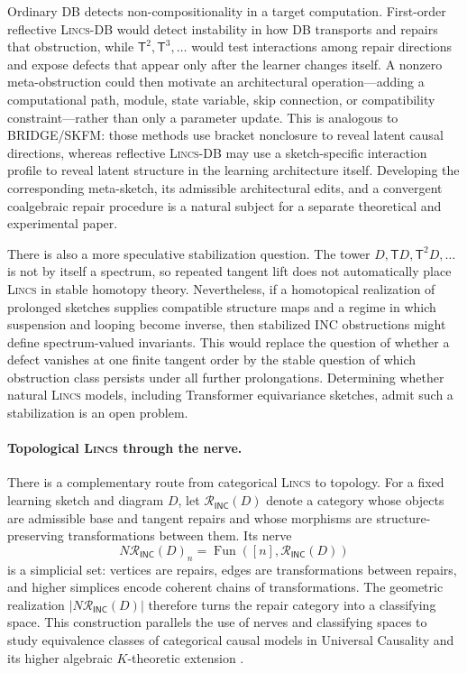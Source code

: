\documentclass{article}
\newcommand{\T}{\mathsf{T}}
\newcommand{\INC}{\mathsf{INC}}
\begin{document}
Ordinary DB detects non-compositionality in a target computation.  First-order
reflective \textsc{Lincs}-DB would detect instability in how DB transports and repairs
that obstruction, while \(\T^2,\T^3,\ldots\) would test interactions among
repair directions and expose defects that appear only after the learner
changes itself.  A nonzero meta-obstruction could then motivate an
architectural operation---adding a computational path, module, state variable,
skip connection, or compatibility constraint---rather than only a parameter
update.  This is analogous to BRIDGE/SKFM: those methods use bracket
nonclosure to reveal latent causal directions, whereas reflective
\textsc{Lincs}-DB may use a sketch-specific interaction profile to reveal latent structure in
the learning architecture itself.  Developing the corresponding meta-sketch,
its admissible architectural edits, and a convergent coalgebraic repair
procedure is a natural subject for a separate theoretical and experimental
paper.

There is also a more speculative stabilization question.  The tower
$D,\T D,\T^2D,\ldots$ is not by itself a spectrum, so repeated tangent lift
does not automatically place \textsc{Lincs}   in stable homotopy theory.  Nevertheless,
if a homotopical realization of prolonged sketches supplies compatible
structure maps and a regime in which suspension and looping become inverse,
then stabilized INC obstructions might define spectrum-valued invariants.
This would replace the question of whether a defect vanishes at one finite
tangent order by the stable question of which obstruction class persists
under all further prolongations.  Determining whether natural \textsc{Lincs}   models,
including Transformer equivariance sketches, admit such a stabilization is an
open problem.

\paragraph{Topological \textsc{Lincs}   through the nerve.}
There is a complementary route from categorical \textsc{Lincs}   to topology.  For a
fixed learning sketch and diagram $D$, let $\mathcal R_{\INC}(D)$ denote a
category whose objects are admissible base and tangent repairs and whose
morphisms are structure-preserving transformations between them.  Its nerve
\[
N\mathcal R_{\INC}(D)_n
  =
  \operatorname{Fun}([n],\mathcal R_{\INC}(D))
\]
is a simplicial set: vertices are repairs, edges are transformations between
repairs, and higher simplices encode coherent chains of transformations.  The
geometric realization $|N\mathcal R_{\INC}(D)|$ therefore turns the repair
category into a classifying space.  This construction parallels the use of
nerves and classifying spaces to study equivalence classes of categorical
causal models in Universal Causality and its higher algebraic $K$-theoretic
extension \citep{mahadevan2023universal,mahadevan2025higherk}.
\end{document}
